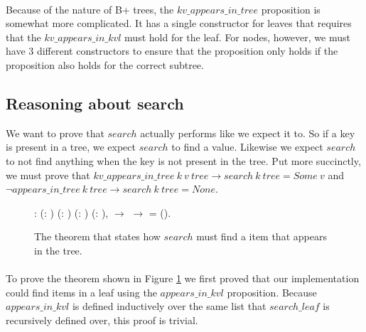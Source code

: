\paragraph{}
Because of the nature of B+ trees, the $kv\_appears\_in\_tree$ proposition is somewhat more complicated. It has a single constructor for leaves that requires that the $kv\_appears\_in\_kvl$ must hold for the leaf. For nodes, however, we must have 3 different constructors to ensure that the proposition only holds if the proposition also holds for the correct subtree.

\subsection{Reasoning about search}
We want to prove that $search$ actually performs like we expect it to. So if a key is present in a tree, we expect $search$ to find a value. Likewise we expect $search$ to not find anything when the key is not present in the tree.
Put more succinctly, we must prove that $kv\_appears\_in\_tree~k~v~tree \rightarrow search~k~tree = Some~v$ and $\lnot appears\_in\_tree~k~tree \rightarrow search~k~tree = None$.

\begin{figure}
  \begin{coqdoccode}
  \coqdocnoindent
    : \coqdockw{\ensuremath{\forall}} (: ) (: ) (:   ) (: ),\coqdoceol
  \coqdocindent{1.00em}
      \ensuremath{\rightarrow} \coqdoceol
  \coqdocindent{1.00em}
      \ensuremath{\rightarrow} \coqdoceol
  \coqdocindent{1.00em}
    = ().\coqdoceol
  \end{coqdoccode}
  \caption{The theorem that states how $search$ must find a item that appears in the tree.}
  \label{fig:search_works}
\end{figure}

\paragraph{}
To prove the theorem shown in Figure \ref{fig:search_works} we first proved that our implementation could find items in a leaf using the $appears\_in\_kvl$ proposition. Because $appears\_in\_kvl$ is defined inductively over the same list that $search\_leaf$ is recursively defined over, this proof is trivial.

